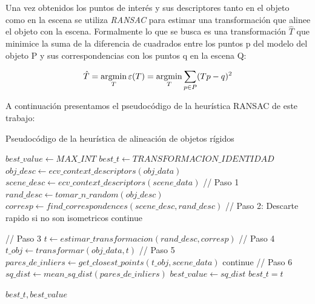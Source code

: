 Una vez obtenidos los puntos de interés y sus descriptores tanto en el objeto como en la escena se utiliza \textit{RANSAC} \cite{ransac} para estimar una transformación que alinee el objeto con la escena. Formalmente lo que se busca es una transformación $\hat{T}$ que minimice la suma de la diferencia de cuadrados entre los puntos p del modelo del objeto P y sus correspondencias con los puntos q en la escena Q:

\begin{equation}\label{eq:mindif}
\hat{T} = \operatorname*{argmin}_T \varepsilon(T) = \operatorname*{argmin}_T \sum_{p \in P}(Tp - q)^2
\end{equation}

A continuación presentamos el pseudocódigo de la heurística RANSAC de este trabajo:
% 
\begin{algorithm}
\caption{Pseudocódigo de la heurística de alineación de objetos rígidos}
\label{lst:icp}
\begin{algorithmic}
	\State $best\_value \gets MAX\_INT$
	\State $best\_t \gets TRANSFORMACION\_IDENTIDAD$
	\State $obj\_desc \gets ecv\_context\_descriptors(obj\_data)$
    \State $scene\_desc \gets  ecv\_context\_descriptors(scene\_data)$
	 
		\State // Paso 1
        \State $rand\_desc \gets tomar\_n\_random(obj\_desc)$
        \State $corresp \gets find\_correspondences(scene\_desc, rand\_desc)$
        \State // Paso 2: Descarte rapido si no son isometricos
			\State continue 
		\EndIf

        \State // Paso 3
		\State $t \gets estimar\_transformacion(rand\_desc, corresp)$
        \State // Paso 4
        \State $t\_obj \gets transformar(obj\_data, t)$
        \State // Paso 5
        \State $pares\_de\_inliers \gets get\_closest\_points(t\_obj, scene\_data)$
			\State continue 
		\EndIf
        \State // Paso 6
        \State $sq\_dist \gets mean\_sq\_dist(pares\_de\_inliers)$
            \State $best\_value \gets sq\_dist$
			\State $best\_t = t$
		\EndIf
	\EndWhile

    \State \Return $best\_t, best\_value$
\EndFunction
\end{algorithmic}
\end{algorithm}


